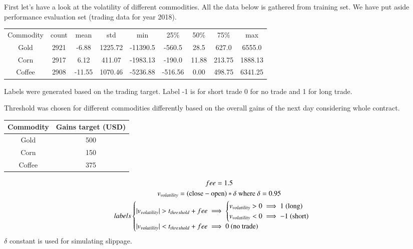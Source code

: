 \documentclass[final,2p]{elsarticle}
\begin{document}
First let's have a look at the volatility of different commodities. All the data below is gathered from training set. We have put aside performance evaluation set (trading data for year 2018).
\begin{center}
    \begin{tabular}{ccccccccc}
        Commodity & count & mean & std & min & 25\% & 50\% & 75\% & max \\
        Gold & 2921 & -6.88 & 1225.72 & -11390.5 & -560.5 & 28.5 & 627.0 & 6555.0 \\
        Corn & 2917 & 6.12 & 411.07 & -1983.13 & -190.0 & 11.88 & 213.75 & 1888.13 \\
        Coffee & 2908 & -11.55 & 1070.46 & -5236.88 & -516.56 & 0.00 & 498.75 & 6341.25 \\
    \end{tabular}
\end{center}

Labels were generated based on the trading target.
Label -1 is for short trade 0 for no trade and 1 for long trade.

Threshold was chosen for different commodities differently based on the overall gains of the next day considering whole contract.

\begin{center}
\begin{tabular}{cc}
    \centering
    Commodity & Gains target (USD) \\
    \hline
    Gold & 500 \\
    Corn & 150 \\
    Coffee & 375 \\
\end{tabular}
\end{center}

\begin{gather}
    fee = 1.5 \\
    v_{volatility} = (\textup{close} - \textup{open})*\delta \textup{ where } \delta = 0.95 \\
    labels
    \begin{cases}
        | v_{volatility} | > t_{threshold} + fee \implies
        \begin{cases}
            v_{volatility} > 0 \implies 1 \textup{ (long)} \\
            v_{volatility} < 0 \implies -1 \textup{ (short)} \\
        \end{cases}\\
        | v_{volatility} | < t_{threshold} + fee \implies 0 \textup{ (no trade)}
    \end{cases}
\end{gather}
$\delta$ constant is used for simulating slippage.
\end{document}
